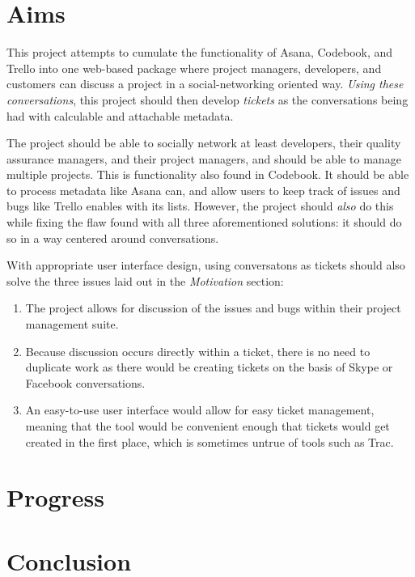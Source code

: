 \documentclass[draft, 10pt]{article}
\begin{document}
\section{Aims}\par
This project attempts to cumulate the functionality of Asana, Codebook, and Trello into one web-based package where project managers, developers, and customers can discuss a project in a social-networking oriented way. \emph{Using these conversations}, this project should then develop \emph{tickets} as the conversations being had with calculable and attachable metadata. \par
The project should be able to socially network at least developers, their quality assurance managers, and their project managers, and should be able to manage multiple projects. This is functionality also found in Codebook. It should be able to process metadata like Asana can, and allow users to keep track of issues and bugs like Trello enables with its lists. However, the project should \emph{also} do this while fixing the flaw found with all three aforementioned solutions: it should do so in a way centered around conversations. \par
With appropriate user interface design, using conversatons as tickets should also solve the three issues laid out in the \emph{Motivation} section:
\begin{enumerate}
\item The project allows for discussion of the issues and bugs within their project management suite.
\item Because discussion occurs directly within a ticket, there is no need to duplicate work as there would be creating tickets on the basis of Skype or Facebook conversations.
\item An easy-to-use user interface would allow for easy ticket management, meaning that the tool would be convenient enough that tickets would get created in the first place, which is sometimes untrue of tools such as Trac.  
\end{enumerate}


\section{Progress}




\section{Conclusion}
\end{document}
